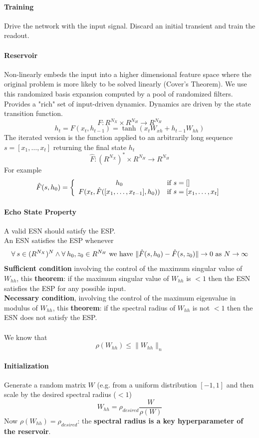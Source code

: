 \documentclass[10pt]{report}
\begin{document}
\paragraph{Training} Drive the network with the input signal. Discard an initial transient and train the readout.
\paragraph{Reservoir} Non-linearly embeds the input into a higher dimensional feature space where the original problem is more likely to be solved linearly (Cover's Theorem). We use this randomized basis expansion computed by a pool of randomized filters. Provides a "rich" set of input-driven dynamics. Dynamics are driven by the state transition function.
$$F:R^{N_X}\times R^{N_H}\rightarrow R^{N_H}$$
$$h_t = F(x_t, h_{t-1}) = \tanh(x_tW_{xh} + h_{t-1}W_{hh})$$
The iterated version is the function applied to an arbitrarily long sequence $s = [x_1,\ldots,x_t]$ returning the final state $h_t$
$$\hat{F}:(R^{N_X})^*\times R^{N_H}\rightarrow R^{N_H}$$
For example $$\hat{F}(s,h_0)=\left\{\begin{array}{c l}
h_0&\hbox{if }s=[]\\
F(x_t,\hat{F}([x_1,\ldots,x_{t-1}],h_0))&\hbox{if }s=[x_1,\ldots,x_t]
\end{array}\right.$$
\paragraph{Echo State Property} A valid ESN should satisfy the ESP.\\
An ESN satisfies the ESP whenever
$$\forall\:s\in (R^{N_X})^N \wedge \forall\:h_0,z_0\in R^{N_H}\hbox{ we have }\|\hat{F}(s, h_0)-\hat{F}(s,z_0)\|\rightarrow 0\hbox{ as }N\rightarrow\infty$$
\textbf{Sufficient condition} involving the control of the maximum singular value of $W_{hh}$, this \textbf{theorem}: if the maximum singular value of $W_{hh}$ is $< 1$ then the ESN satisfies the ESP for any possible input.\\
\textbf{Necessary condition}, involving the control of the maximum eigenvalue in modulus of $W_{hh}$, this \textbf{theorem}: if the spectral radius of $W_{hh}$ is not $< 1$ then the ESN does not satisfy the ESP.\\\\
We know that $$\rho(W_{hh})\leq \|W_{hh}\|_n$$
\paragraph{Initialization} Generate a random matrix $W$ (e.g. from a uniform distribution $[-1,1]$ and then scale by the desired spectral radius ($<1$) $$W_{hh} =\rho_{desired}\frac{W}{\rho(W)}$$
Now $\rho(W_{hh}) = \rho_{desired}$: the \textbf{spectral radius is a key hyperparameter of the reservoir}.
\end{document}
